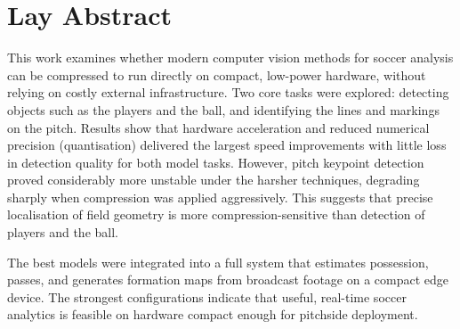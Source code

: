 \section{Lay Abstract}

This work examines whether modern computer vision methods for soccer analysis can be compressed to run directly on compact, low-power hardware, without relying on costly external infrastructure. Two core tasks were explored: detecting objects such as the players and the ball, and identifying the lines and markings on the pitch. Results show that hardware acceleration and reduced numerical precision (quantisation) delivered the largest speed improvements with little loss in detection quality for both model tasks. However, pitch keypoint detection proved considerably more unstable under the harsher techniques, degrading sharply when compression was applied aggressively. This suggests that precise localisation of field geometry is more compression-sensitive than detection of players and the ball.

The best models were integrated into a full system that estimates possession, passes, and generates formation maps from broadcast footage on a compact edge device. The strongest configurations indicate that useful, real-time soccer analytics is feasible on hardware compact enough for pitchside deployment.